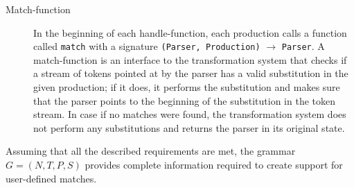 \begin{description}
    \item[Match-function] In the beginning of each handle-function, each
    production calls a function called \verb|match| with a signature
    \verb/(Parser, Production)/ $\to$ \verb/Parser/.  A match-function 
    is an interface to the transformation system that checks if a 
    stream of tokens
    pointed at by the parser has a valid substitution in the given
    production; if it does, it performs the substitution and makes sure
    that the parser points to the beginning of the substitution in the
    token stream.  In case if no matches were found, the transformation
    system
    does not perform any substitutions and returns the parser in its
    original state.
\end{description}

Assuming that all the described requirements are met, the grammar 
$G = (N, T, P, S)$ provides complete information required to create 
support for user-defined matches.

